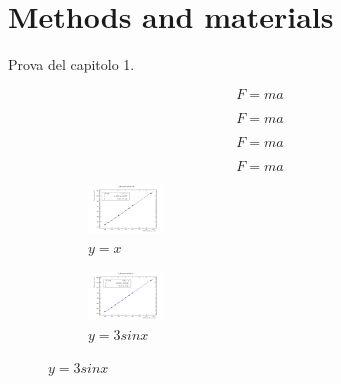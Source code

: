 \chapter{Methods and materials}


Prova del capitolo 1.

\begin{equation}
    F = ma
\end{equation}


\begin{equation}
    F = ma
\end{equation}


\begin{equation}
    F = ma
\end{equation}


\begin{equation}
    F = ma
\end{equation}



\begin{figure}
    \centering
    \begin{subfigure}[b]{0.15\textwidth}
        \centering
        \includegraphics[width=2cm]{figures/ch0.pdf}
        \caption{$y=x$}
        \label{fig:y equals x}
    \end{subfigure}
    \hfill
    \begin{subfigure}[b]{0.15\textwidth}
        \centering
        \includegraphics[width=2cm]{figures/ch1.pdf}
        \caption{$y=3sinx$}
        \label{fig:three sin x}
    \end{subfigure}
\end{figure}






